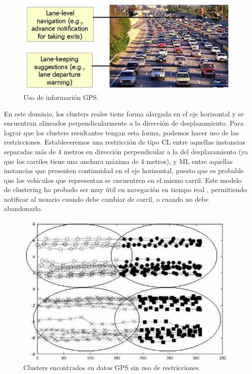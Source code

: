 \begin{figure}[!h]
	\centering
	\includegraphics[scale=0.3]{imagenes/c3/GPS/Coches} 
	\caption[Uso de información GPS.]{Uso de información GPS. \cite{Survey:2007} \cite{Wagstaff:2001b}}\label{fig:figure14}
\end{figure}


En este dominio, los clusters reales tiene forma alargada en el eje horizontal y se encuentran alineados perpendicularmente a la dirección de desplazamiento. Para lograr que los clusters resultantes tengan esta forma, podemos hacer uso de las restricciones. Estableceremos una restricción de tipo \acf{CL} entre aquellas instancias separadas más de 4 metros en dirección perpendicular a la del desplazamiento (ya que los carriles tiene una anchura máxima de 4 metros), y \acf{ML} entre aquellas instancias que presenten continuidad en el eje horizontal, puesto que es probable que los vehículos que representan se encuentren en el mismo carril. Este modelo de clustering ha probado ser muy útil en navegación en tiempo real \cite{Wagstaff:2001b}, permitiendo notificar al usuario cuando debe cambiar de carril, o cuando no debe abandonarlo.

\begin{figure}[!h]
	\centering
	\includegraphics[scale=0.32]{imagenes/c3/GPS/Instancias} 
	\caption[Clusters encontrados en datos GPS sin uso de restricciones.]{Clusters encontrados en datos \acs{GPS} sin uso de restricciones. \cite{Survey:2007} \cite{Wagstaff:2001b}}\label{fig:figure15}
\end{figure}

